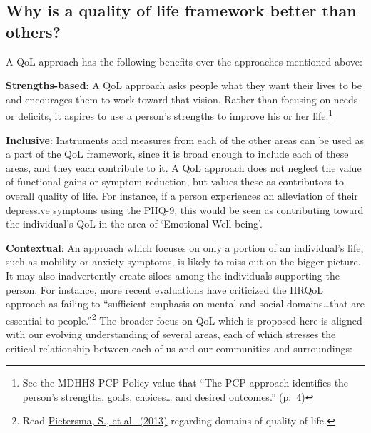 \documentclass[
]{book}
\begin{document}
\hypertarget{why-is-a-quality-of-life-framework-better-than-others}{%
\subsection{Why is a quality of life framework better than others?}\label{why-is-a-quality-of-life-framework-better-than-others}}

A QoL approach has the following benefits over the approaches mentioned above:

\textbf{Strengths-based}: A QoL approach asks people what they want their lives to be and encourages them to work toward that vision. Rather than focusing on needs or deficits, it aspires to use a person's strengths to improve his or her life.\footnote{See the MDHHS PCP Policy value that ``The PCP approach identifies the person's strengths, goals, choices\ldots{} and desired outcomes.'' (p.~4)}

\textbf{Inclusive}: Instruments and measures from each of the other areas can be used as a part of the QoL framework, since it is broad enough to include each of these areas, and they each contribute to it. A QoL approach does not neglect the value of functional gains or symptom reduction, but values these as contributors to overall quality of life. For instance, if a person experiences an alleviation of their depressive symptoms using the PHQ-9, this would be seen as contributing toward the individual's QoL in the area of `Emotional Well-being'.

\textbf{Contextual}: An approach which focuses on only a portion of an individual's life, such as mobility or anxiety symptoms, is likely to miss out on the bigger picture. It may also inadvertently create siloes among the individuals supporting the person. For instance, more recent evaluations have criticized the HRQoL approach as failing to ``sufficient emphasis on mental and social domains\ldots{}that are essential to people.''\footnote{Read \href{https://www.ncbi.nlm.nih.gov/pmc/articles/PMC4031380/}{Pietersma, S., et al.~(2013)} regarding domains of quality of life.} The broader focus on QoL which is proposed here is aligned with our evolving understanding of several areas, each of which stresses the critical relationship between each of us and our communities and surroundings:
\end{document}
